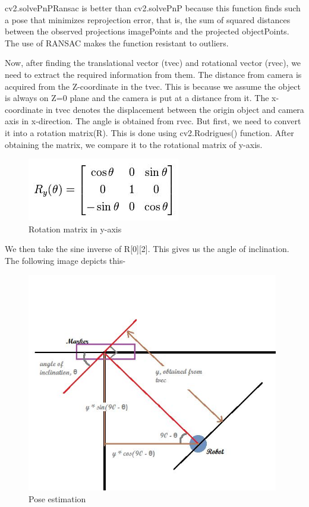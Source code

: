 \documentclass[]{article}
\begin{document}
cv2.solvePnPRansac is better than cv2.solvePnP because this function
finds such a pose that minimizes reprojection error, that is, the sum of
squared distances between the observed projections imagePoints and the
projected objectPoints. The use of RANSAC makes the function resistant
to outliers.

Now, after finding the translational vector (tvec) and rotational vector
(rvec), we need to extract the required information from them. The
distance from camera is acquired from the Z-coordinate in the tvec. This
is because we assume the object is always on Z=0 plane and the camera is
put at a distance from it. The x-coordinate in tvec denotes the
displacement between the origin object and camera axis in x-direction.
The angle is obtained from rvec. But first, we need to convert it into a
rotation matrix(R). This is done using cv2.Rodrigues() function. After
obtaining the matrix, we compare it to the rotational matrix of y-axis.

\begin{figure}[htbp]
\centering
\includegraphics{images/Pose Estimation/Rotation matrix.JPG}
\caption{Rotation matrix in y-axis}
\end{figure}
\pagebreak
We then take the sine inverse of R{[}0{]}{[}2{]}. This gives us the
angle of inclination. The following image depicts this-

\begin{figure}[htbp]
\centering
\includegraphics[width = 11cm]{images/Pose Estimation/Pose.JPG}
\caption{Pose estimation}
\end{figure}
\pagebreak
\end{document}
